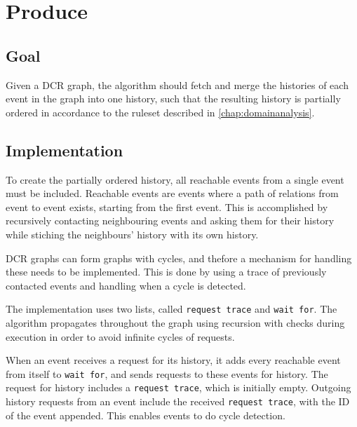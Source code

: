 
\section{Produce}
\subsection{Goal} %
Given a DCR graph, the algorithm should fetch and merge the histories of each event in the graph into one history, such that the resulting history is partially ordered in accordance to the ruleset described in \autoref{chap:domainanalysis}. 


\subsection{Implementation} %
To create the partially ordered history, all reachable events from a single event must be included. Reachable events are events where a path of relations from event to event exists, starting from the first event. This is accomplished by recursively contacting neighbouring events and asking them for their history while stiching the neighbours' history with its own history. 

\newpar DCR graphs can form graphs with cycles, and thefore a mechanism for handling these needs to be implemented. This is done by using a trace of previously contacted events and handling when a cycle is detected.

\newpar The implementation uses two lists, called \texttt{request trace} and \texttt{wait for}.
The algorithm propagates throughout the graph using recursion with checks during execution in order to avoid infinite cycles of requests.

\newpar When an event receives a request for its history, it adds every reachable event from itself to \texttt{wait for}, and sends requests to these events for history. The request for history includes a \texttt{request trace}, which is initially empty. Outgoing history requests from an event include the received \texttt{request trace}, with the ID of the event appended. This enables events to do cycle detection.


